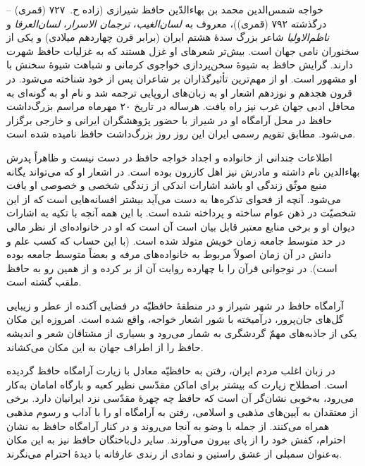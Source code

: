 خواجه شمس‌الدین محمد بن بهاءالدّین حافظ شیرازی 
(زاده ح.~۷۲۷ (قمری) -- درگذشته ۷۹۲ (قمری))،
معروف به {\em لسان‌الغیب}، {\em ترجمان الاسرار}، {\em لسان‌العرفا}
و {\em ناظم‌الاولیا} شاعر بزرگ سدهٔ هشتم ایران
(برابر قرن چهاردهم میلادی) و یکی از سخنوران نامی جهان است.
بیش‌تر شعرهای او غزل هستند که به غزلیات حافظ شهرت دارند.
گرایش حافظ به شیوهٔ سخن‌پردازی خواجوی کرمانی و
شباهت شیوهٔ سخنش با او مشهور است.
او از مهم‌ترین تأثیرگذاران بر شاعران پس از خود شناخته می‌شود.
در قرون هجدهم و نوزدهم اشعار او به زبان‌های اروپایی ترجمه شد
و نام او به گونه‌ای به محافل ادبی جهان غرب نیز راه یافت.
هرساله در تاریخ ۲۰ مهرماه مراسم بزرگ‌داشت حافظ در محل آرامگاه او در شیراز
با حضور پژوهشگران ایرانی و خارجی برگزار می‌شود.
مطابق تقویم رسمی ایران این روز روز بزرگ‌داشت حافظ نامیده شده است.

اطلاعات چندانی از خانواده و اجداد خواجه حافظ در دست نیست
و ظاهراً پدرش بهاءالدین نام داشته و مادرش نیز اهل کازرون بوده است.
در اشعار او که می‌تواند یگانه منبع موثّق زندگی او باشد
اشارات اندکی از زندگی شخصی و خصوصی او یافت می‌شود.
آنچه از فحوای تذکره‌ها به دست می‌آید بیشتر افسانه‌هایی است
که از این شخصیّت در ذهن عوام ساخته و پرداخته شده است.
با این همه آنچه با تکیه به اشارات دیوان او و برخی منابع معتبر
قابل بیان است آن است که او در خانواده‌ای از نظر مالی در حد متوسط
جامعه زمان خویش متولد شده است.
(با این حساب که کسب علم و دانش در آن زمان اصولاً
مربوط به خانواده‌های مرفه و بعضاً متوسط جامعه بوده است).
در نوجوانی قرآن را با چهارده روایت آن از بر کرده
و از همین رو به حافظ ملقب گشته است.

آرامگاه حافظ در شهر شیراز و در منطقهٔ حافظیّه در فضایی
آکنده از عطر و زیبایی گل‌های جان‌پرور، درآمیخته با شور
اشعار خواجه، واقع شده است. امروزه این مکان یکی از جاذبه‌های
مهمّ گردشگری به شمار می‌رود و بسیاری از مشتاقان شعر و اندیشه حافظ را
از اطراف جهان به این مکان می‌کشاند.

در زبان اغلب مردم ایران، رفتن به حافظیّه معادل با
زیارت آرامگاه حافظ گردیده است. اصطلاح زیارت که بیشتر
برای اماکن مقدّسی نظیر کعبه و بارگاه امامان به‌کار می‌رود،
به‌خوبی نشان‌گر آن است که حافظ چه چهرهٔ مقدّسی نزد ایرانیان دارد.
برخی از معتقدان به آیین‌های مذهبی و اسلامی، رفتن به آرامگاه او را
با آداب و رسوم مذهبی همراه می‌کنند. از جمله با وضو به آنجا می‌روند
و در کنار آرامگاه حافظ به نشان احترام، کفش خود را از پای بیرون می‌آورند.
سایر دل‌باختگان حافظ نیز به این مکان به‌عنوان سمبلی از عشق راستین
و نمادی از رندی عارفانه با دیدهٔ احترام می‌نگرند.
